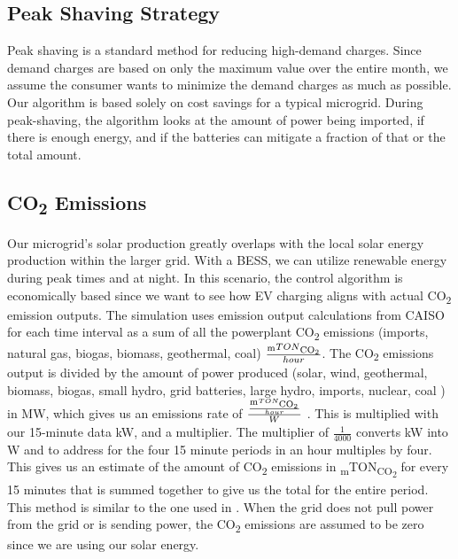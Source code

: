 \documentclass[conference]{IEEEtran}
\begin{document}
    \subsection{Peak Shaving Strategy}
       		Peak shaving is a standard method for reducing high-demand charges. Since demand charges are based on only the maximum value over the entire month, we assume the consumer wants to minimize the demand charges as much as possible. Our algorithm is based solely on cost savings for a typical microgrid. During peak-shaving, the algorithm looks at the amount of power being imported, if there is enough energy, and if the batteries can mitigate a fraction of that or the total amount. 
    \subsection{CO\textsubscript{2} Emissions}
        	Our microgrid's solar production greatly overlaps with the local solar energy production within the larger grid.  With a BESS, we can utilize renewable energy during peak times and at night. In this scenario, the control algorithm is economically based since we want to see how EV charging aligns with actual CO\textsubscript{2} emission outputs. The simulation uses emission output calculations from CAISO for each time interval as a sum of all the powerplant CO\textsubscript{2} emissions (imports, natural gas, biogas, biomass, geothermal, coal) $\frac{\textsubscript{m}TON\textsubscript{CO\textsubscript{2}}}{hour}$. The CO\textsubscript{2} emissions output is divided by the amount of power produced (solar, wind, geothermal, biomass, biogas, small hydro, grid batteries, large hydro, imports, nuclear, coal ) in MW, which gives us an emissions rate of $\frac{\frac{\textsubscript{m}TON\textsubscript{CO\textsubscript{2}}}{hour}}{W}$ . This is multiplied with our 15-minute data kW, and a multiplier. The multiplier of  $\frac{1}{4000}$ converts kW into W and to address for the four 15 minute periods in an hour multiples by four.  This gives us an estimate of the amount of CO\textsubscript{2} emissions in \textsubscript{m}TON\textsubscript{CO\textsubscript{2}} for every 15 minutes that is summed together to give us the total for the entire period.  This method is similar to the one used in \cite{garrido2021dynamic}.  When the grid does not pull power from the grid or is sending power, the CO\textsubscript{2} emissions are assumed to be zero since we are using our solar energy.
\end{document}
